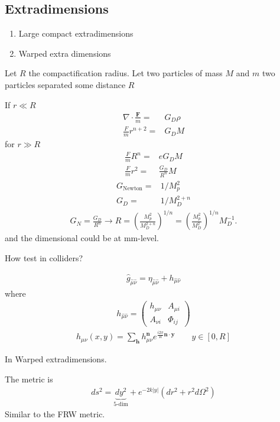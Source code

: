 \documentclass[12pt,letterpaper]{article}
\begin{document}
\subsection{Extradimensions}
\begin{enumerate}
\item Large compact extradimensions
\item Warped extra dimensions 
\end{enumerate}
Let $R$ the compactification radius. Let two particles of mass $M$ and
$m$ two particles separated some distance $R$

If $r\ll R$ 
\begin{align*}
\nabla \cdot \frac{\mathbf{F}}{m}=&G_D \rho\nonumber\\
\frac{{F}}{m}r^{n+2}=& G_D M
\end{align*}
for $r\gg R$ 
\begin{align*}
\frac{F}{m}R^n=&eG_D M \nonumber\\
\frac{F}{m}r^2=&\frac{G_D}{R^n} M 
\end{align*}
\begin{align}
  G_{\text{Newton}}=&1/M_p^2 \nonumber\\
G_D=&1/M_D^{2+n}
\end{align}
\begin{align*}
G_N=\frac{G_D}{R^n}\rightarrow R=\left( \frac{M_p^2}{M_D^{2+n}} \right)^{1/n}
=\left( \frac{M_p^2}{M_D^2} \right)^{1/n}M_D^{-1}.
\end{align*}
and the dimensional could be at mm-level. 

How test in colliders?

\begin{align}
  \hat{g}_{\hat{\mu}\hat{\nu}}=\eta_{\hat{\mu}\hat{\nu}}+h_{\hat{\mu}\hat{\nu}}
\end{align}
where 
\begin{align}
h_{\hat{\mu}\hat{\nu}}=
\begin{pmatrix}
  h_{\mu\nu} & A_{\mu i}\\
A_{\nu i} &\Phi_{ij}
\end{pmatrix}
\end{align}
\begin{align*}
   h_{\mu\nu}(x,y)=\sum_{\mathbf{h}}h_{\mu\nu}^{\mathbf{n}}e^{\frac{i2\pi}{R}\mathbf{n}\cdot \mathbf{y}}\qquad y\in [0,R]
\end{align*}

In Warped extradimensions.

The metric is
\begin{align*}
  ds^2=\underbrace{dy^2}_{\text{5-dim}}
+ e^{-2 k|y|}(dr^2+r^2d\Omega^2)
\end{align*}
Similar to the FRW metric. 
\end{document}
